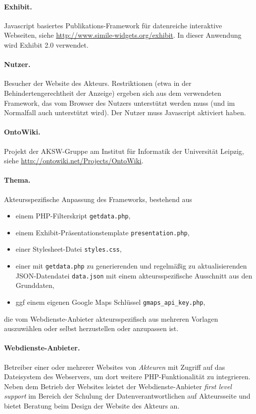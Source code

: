 \documentclass[11pt,a4paper]{article}
\begin{document}
\paragraph{Exhibit.} 
Javascript basiertes Publikations-Framework für datenreiche interaktive
Webseiten, siehe \url{http://www.simile-widgets.org/exhibit}.  In dieser
Anwendung wird Exhibit 2.0 verwendet.

\paragraph{Nutzer.} 
Besucher der Website des Akteurs. Restriktionen (etwa in der
Behindertengerechtheit der Anzeige) ergeben sich aus dem verwendeten
Framework, das vom Browser des Nutzers unterstützt werden muss (und im
Normalfall auch unterstützt wird). Der Nutzer muss Javascript aktiviert haben.

\paragraph{OntoWiki.} 
Projekt der AKSW-Gruppe am Institut für Informatik der Universität Leipzig,
siehe \url{http://ontowiki.net/Projects/OntoWiki}.

\paragraph{Thema.} 
Akteursspezifische Anpassung des Frameworks, bestehend aus 
\begin{itemize}
\item einem PHP-Filterskript \texttt{getdata.php},
\item einem Exhibit-Präsentationstemplate \texttt{presentation.php},
\item einer Stylesheet-Datei \texttt{styles.css},
\item einer mit \texttt{getdata.php} zu generierenden und regelmäßig zu
  aktualisierenden JSON-Datendatei \texttt{data.json} mit einem
  akteursspezifische Ausschnitt aus den Grunddaten,
\item ggf einem eigenen Google Maps Schlüssel \texttt{gmaps\_api\_key.php},
\end{itemize}
die vom Webdienste-Anbieter akteursspezifisch aus mehreren Vorlagen
auszuwählen oder selbst herzustellen oder anzupassen ist.

\paragraph{Webdienste-Anbieter.} 
Betreiber einer oder mehrerer Websites von \emph{Akteuren} mit Zugriff auf das
Dateisystem des Webservers, um dort weitere PHP-Funktionalität zu integrieren.
Neben dem Betrieb der Websites leistet der Webdienste-Anbieter \emph{first
  level support} im Bereich der Schulung der Datenverantwortlichen auf
Akteursseite und bietet Beratung beim Design der Website des Akteurs an.
\end{document}

